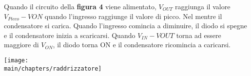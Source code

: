 \documentclass[\main/main.tex]{subfiles}
\begin{document}
Quando il circuito della \textbf{figura 4} viene alimentato, $V_{OUT}$ raggiunga il valore $V_{Picco}-V{ON}$ quando l'ingresso raggiunge il valore di picco. Nel mentre il condensatore si carica. 
Quando l'ingresso comincia a diminuire, il diodo si spegne e il condensatore inizia a scaricarsi.
Quando $V_{IN}-V{OUT}$ torna ad essere maggiore di $V_{ON}$, il diodo torna ON e il condensatore ricomincia a caricarsi.

\begin{center}
\texttt{[image: \\main/chapters/raddrizzatore]}
\end{center}
\end{document}
